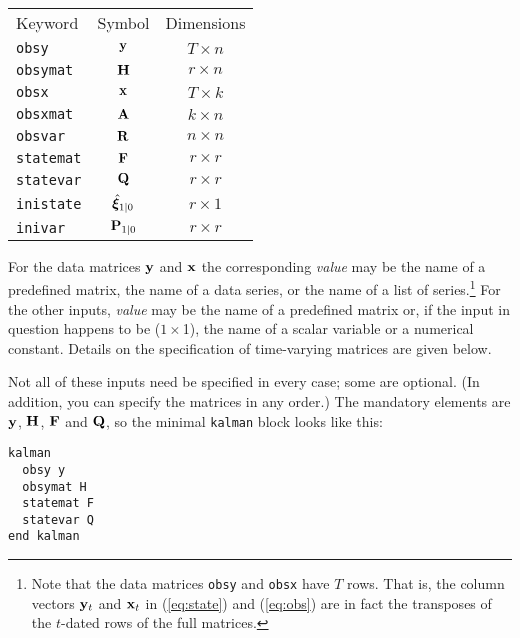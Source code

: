 \documentclass[a4paper]{article}
\newcommand{\obsvec}{\ensuremath\mathbf{y}}
\newcommand{\obsmat}{\ensuremath\mathbf{H}}
\newcommand{\obsx}{\ensuremath\mathbf{x}}
\newcommand{\obsxmat}{\ensuremath\mathbf{A}}
\newcommand{\obsvar}{\ensuremath\mathbf{R}}
\newcommand{\statevec}{\ensuremath\mathbf{\bm \xi}}
\newcommand{\statemat}{\ensuremath\mathbf{F}}
\newcommand{\strvar}{\ensuremath\mathbf{Q}}
\newcommand{\statevar}{\ensuremath\mathbf{P}}
\begin{document}
\begin{center}
\begin{tabular}{lcc}
Keyword & Symbol & Dimensions \\[6pt]
\texttt{obsy}     & $\obsvec$         & $T \times n$ \\
\texttt{obsymat}  & $\obsmat$         & $r \times n$ \\
\texttt{obsx}     & $\obsx$           & $T \times k$ \\
\texttt{obsxmat}  & $\obsxmat$        & $k \times n$ \\ 
\texttt{obsvar}   & $\obsvar$         & $n \times n$ \\
\texttt{statemat} & $\statemat$         & $r \times r$ \\
\texttt{statevar} & $\strvar$         & $r \times r$ \\
\texttt{inistate} & $\hat{\statevec}_{1|0}$  & $r \times 1$ \\
\texttt{inivar}   & $\statevar_{1|0}$ & $r \times r$ \\
\end{tabular}
\end{center}

For the data matrices $\obsvec$ and $\obsx$ the corresponding
\textsl{value} may be the name of a predefined matrix, the name of a
data series, or the name of a list of series.\footnote{Note that the
  data matrices \texttt{obsy} and \texttt{obsx} have $T$ rows.  That
  is, the column vectors $\obsvec_t$ and $\obsx_t$ in (\ref{eq:state})
  and (\ref{eq:obs}) are in fact the transposes of the $t$-dated rows
  of the full matrices.}  For the other inputs, \textsl{value} may be
the name of a predefined matrix or, if the input in question happens
to be ($1 \times $1), the name of a scalar variable or a numerical
constant.  Details on the specification of time-varying matrices
are given below.

Not all of these inputs need be specified in every case; some are
optional. (In addition, you can specify the matrices in any order.)
The mandatory elements are $\obsvec$, $\obsmat$, $\statemat$ and
$\strvar$, so the minimal \texttt{kalman} block looks like this:

\begin{verbatim}
kalman 
  obsy y
  obsymat H
  statemat F
  statevar Q
end kalman
\end{verbatim} 
\end{document}
